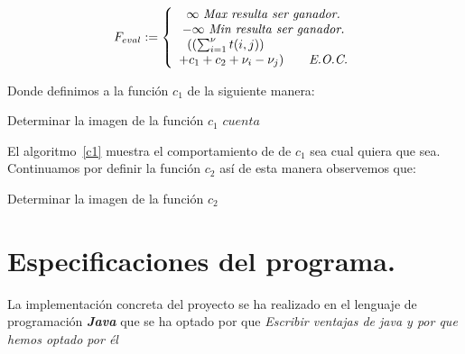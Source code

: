 \documentclass[12pt,twocolumn,draft]{article}
\begin{document}
$$ 
F_{eval}:= \left\{\begin{array}{c l}
  \infty\ \textit{Max\ resulta\ ser\ ganador.}\\
  -\infty\ \textit{Min\ resulta\ ser\ ganador.}\\
  ((\sum_{i=1}^{\nu} t(i,j)) \qquad \qquad \qquad\\
  +c_{1}+c_{2}+\nu_{i}-\nu_{j}) \qquad \textit{E.O.C.}
\end{array}
\right.
$$

Donde definimos a la funci\'on $c_{1}$ de la siguiente manera:

\begin{algorithm}
\begin{algorithmic}[1]
\ENSURE Determinar la imagen de la funci\'on $c_{1}$
\ENDIF
\ENDFOR
{}
\ELSE
{}
\ENDIF
\ENDFOR
\RETURN $cuenta$

\end{algorithmic}
\caption{Definici\'on de la funci\'on $c_{1}$}
\label{c1}
\end{algorithm}

El algoritmo~\ref{c1} muestra el comportamiento de de $c_{1}$ sea cual quiera que sea.\\

Continuamos por definir la funci\'on $c_{2}$ as\'i de esta manera observemos que:\\

\begin{algorithm}
\begin{algorithmic}[1]
\ENSURE Determinar la imagen de la funci\'on $c_{2}$
\ENDIF
\ENDFOR


\end{algorithmic}
\caption{Definici\'on de la funci\'on $c_{2}$}
\label{c2}
\end{algorithm}

\section{Especificaciones del programa.}

La implementaci\'on concreta del proyecto se ha realizado en el lenguaje de programaci\'on \textbf{\textit{Java}}\cite{JAVA} que se ha optado por que \textit{Escribir ventajas de java y por que hemos optado por \'el}\\
\end{document}

